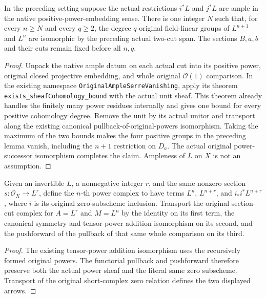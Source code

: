 \begin{lemma}
\label{lem:seshadri-eventual-two-cut-cohomology-iso}
\leanok
In the preceding setting suppose the actual restrictions $i^*L$ and
$j^*L$ are ample in the native positive-power-embedding sense. There is
one integer $N$ such that, for every $n\geq N$ and every $q\geq2$,
the degree $q$ original field-linear groups of $L^{n+1}$ and $L^n$
are isomorphic by the preceding actual two-cut span. The sections
$B,a,b$ and their cuts remain fixed before all $n,q$.
\end{lemma}
\begin{proof}
Unpack the native ample datum on each actual cut into its positive
power, original closed projective embedding, and whole original
$\mathcal O(1)$ comparison. In the existing namespace
\texttt{OriginalAmpleSerreVanishing}, apply its theorem
\texttt{exists\_sheafCohomology\_bound} with the actual unit sheaf. This theorem already handles the finitely
many power residues internally and gives one bound for every positive
cohomology degree. Remove the unit by its actual unitor and transport
along the existing canonical pullback-of-original-powers isomorphism.
Taking the maximum of the two bounds makes the four positive groups
in the preceding lemma vanish, including the $n+1$ restriction on $D_a$.
The actual original power-successor isomorphism completes the claim.
Ampleness of $L$ on $X$ is not an assumption.
\end{proof}

\begin{definition}
\label{def:seshadri-same-section-original-power-complex}
\leanok
Given an invertible $L$, a nonnegative integer $r$, and the same nonzero
section $s:\mathcal O_X\to L^r$, define the $n$-th power complex to have
terms $L^n$, $L^{n+r}$, and $i_*i^*L^{n+r}$, where $i$ is its original
zero-subscheme inclusion. Transport the original section-cut complex
for $A=L^r$ and $M=L^n$ by the identity on its first term, the canonical
symmetry and tensor-power addition isomorphism on its second, and the
pushforward of the pullback of that same whole comparison on its third.
\end{definition}
\begin{proof}
The existing tensor-power addition isomorphism uses the recursively formed
original powers. The functorial pullback and pushforward therefore preserve
both the actual power sheaf and the literal same zero subscheme. Transport
of the original short-complex zero relation defines the two displayed arrows.
\end{proof}

